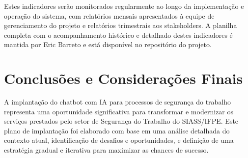 \documentclass[12pt,a4paper]{article}
\begin{document}
\begin{table}[htbp]
\centering
{}
\caption{Indicadores GPN do Projeto}
\end{table}

Estes indicadores serão monitorados regularmente ao longo da implementação e operação do sistema, com relatórios mensais apresentados à equipe de gerenciamento do projeto e relatórios trimestrais aos stakeholders. A planilha completa com o acompanhamento histórico e detalhado destes indicadores é mantida por Eric Barreto e está disponível no repositório do projeto.

\clearpage
\section{Conclusões e Considerações Finais}

A implantação do chatbot com IA para processos de segurança do trabalho representa uma oportunidade significativa para transformar e modernizar os serviços prestados pelo setor de Segurança do Trabalho do SIASS/IFPE. Este plano de implantação foi elaborado com base em uma análise detalhada do contexto atual, identificação de desafios e oportunidades, e definição de uma estratégia gradual e iterativa para maximizar as chances de sucesso.
\end{document}
